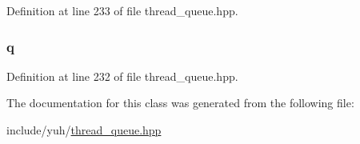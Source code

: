 \-Definition at line 233 of file thread\-\_\-queue.\-hpp.

\hypertarget{classyuh_1_1thread__queue_ab2e35c005c3ff9aeb95720a050b31c35}{
\subsubsection[{q}]{ {\bf q}}}\label{d2/d54/classyuh_1_1thread__queue_ab2e35c005c3ff9aeb95720a050b31c35}


\-Definition at line 232 of file thread\-\_\-queue.\-hpp.



\-The documentation for this class was generated from the following file\-:\begin{DoxyCompactItemize}
\item 
include/yuh/\hyperlink{thread__queue_8hpp}{thread\-\_\-queue.\-hpp}\end{DoxyCompactItemize}
